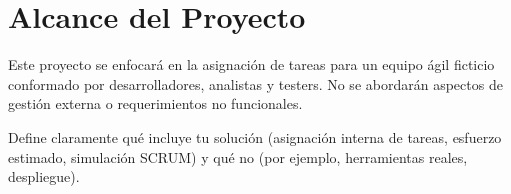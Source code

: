 \section{Alcance del Proyecto}
Este proyecto se enfocará en la asignación de tareas para un equipo ágil ficticio conformado por desarrolladores, analistas y testers. No se abordarán aspectos de gestión externa o requerimientos no funcionales.
\vspace{0.5cm}

\begin{tcolorbox}[colback=gray!10, colframe=black!30, title={Sugerencia para esta sección}]
    Define claramente qué incluye tu solución (asignación interna de tareas, esfuerzo estimado, simulación SCRUM) y qué no (por ejemplo, herramientas reales, despliegue).
\end{tcolorbox}
